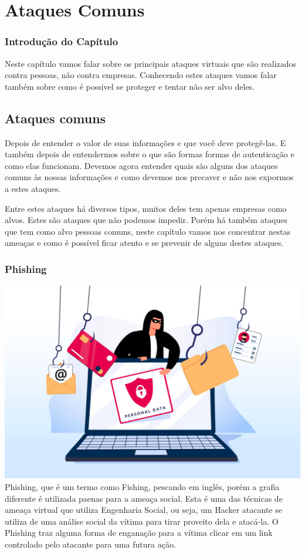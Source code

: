 \part{Ataques Comuns}


\section{Introdução do Capítulo}

Neste capítulo vamos falar sobre os principais ataques virtuais que são realizados contra pessoas, não contra empresas. Conhecendo estes ataques vamos falar também sobre como é possivel se proteger e tentar não ser alvo deles.

\chapter{Ataques comuns}

Depois de entender o valor de suas informações e que você deve protegê-las. E também depois de entendermos sobre o que são formas formas de autenticação e como elas funcionam. Devemos agora entender quais são alguns dos ataques comuns às nossas informações e como devemos nos precaver e não nos expormos a estes ataques.

Entre estes ataques há diversos tipos, muitos deles tem apenas empresas como alvos. Estes são ataques que não podemos impedir. Porém há também ataques que tem como alvo pessoas comuns, neste capítulo vamos nos concentrar nestas ameaças e como é possível ficar atento e se prevenir de alguns destes ataques.

\section{Phishing}
\includegraphics[width=\textwidth]{img/phishing.png}
Phishing, que é um termo como Fishing, pescando em inglês, porém a grafia diferente é utilizada paenas para a ameaça social. Esta é uma das técnicas de ameaça virtual que utiliza Engenharia Social, ou seja, um Hacker atacante se utiliza de uma análise social da vítima para tirar proveito dela e atacá-la. O Phishing traz alguma forma de enganação para a vítima clicar em um link controlado pelo atacante para uma futura ação.


